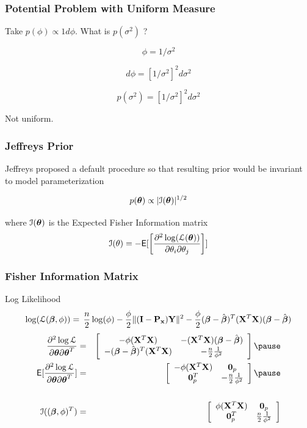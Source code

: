 \documentclass[handout]{beamer}\usepackage[]{graphicx}\usepackage[]{color}
\begin{document}
\begin{frame} \frametitle{Potential Problem with Uniform Measure}

Take $p(\phi) \propto 1 d\phi$.   What is $p(\sigma^2)$ ? \pause

$$\phi = 1/\sigma^2$$  \pause

$$d \phi = [1/\sigma^2]^2 d\sigma^2$$  \pause

$$p(\sigma^2) = [1/\sigma^2]^2 d\sigma^2$$  \pause

Not uniform.
\end{frame}
\begin{frame}
  \frametitle{Jeffreys Prior}

Jeffreys proposed a default  procedure so that resulting prior
would be invariant to model parameterization  \pause

$$p(\boldsymbol{\theta}) \propto |{\cal{I}}(\boldsymbol{\theta})|^{1/2}$$

where ${\cal{I}}(\boldsymbol{\theta})$ is the  Expected Fisher Information matrix
\pause
$$
{\cal{I}}(\theta) = - \textsf{E}[ \left[ \frac{\partial^2 \log({\cal{L}}(\boldsymbol{\theta}))}{\partial
  \theta_i \partial \theta_j} \right] ]
$$
\end{frame}
\begin{frame}
  \frametitle{Fisher Information Matrix}
Log Likelihood
$$
    \log({\cal{L}}(\boldsymbol{\beta}, \phi))  =  \, \frac{n}{2} \log(\phi)  - \frac{\phi}{2}
     \| (\mathbf{I} - \mathbf{P}_{\mathbf{x}}) \mathbf{Y}\|^2
 - \frac{\phi}{2}(\boldsymbol{\beta} - \hat{\boldsymbol{\beta}})^T(\mathbf{X}^T\mathbf{X})(\boldsymbol{\beta} - \hat{\boldsymbol{\beta}})
$$ \pause
  \begin{eqnarray*}
\frac{\partial^2 \log \cL} { \partial \tb \partial \tb^T} & = &
\left[
  \begin{array}{cc}
    -\phi (\X^T\X) & -(\X^T\X) (\b - \bhat) \\
  - (\b - \bhat)^T (\X^T\X) & -\frac{n}{2} \frac{1}{\phi^2} \\
  \end{array}
\right] \pause \\
\E[\frac{\partial^2 \log \cL} { \partial \tb \partial \tb^T}] & = &
\left[
  \begin{array}{cc}
    -\phi (\X^T\X) & \zero_p \\
  \zero_p^T & -\frac{n}{2} \frac{1}{\phi^2} \\
  \end{array}
\right] \pause \\
& & \\
\cI((\b, \phi)^T) & = & \left[
  \begin{array}{cc}
    \phi (\X^T\X) & \zero_p \\
  \zero_p^T & \frac{n}{2} \frac{1}{\phi^2}
  \end{array}
\right]
  \end{eqnarray*}
\end{frame}
\end{document}

